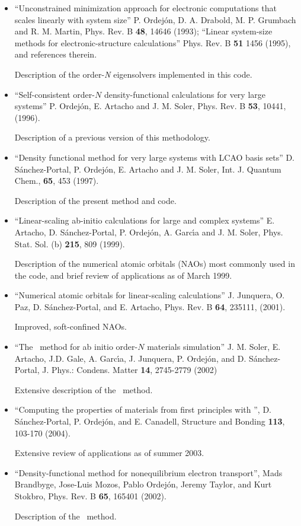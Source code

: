 \begin{itemize}

\item
``Unconstrained minimization approach for electronic computations
that scales linearly with system size''
P. Ordej\'on, D. A. Drabold, M. P. Grumbach and R. M. Martin,
Phys. Rev. B \textbf{48}, 14646 (1993);
``Linear system-size methods for electronic-structure calculations''
Phys. Rev. B \textbf{51} 1456 (1995), and references therein.

Description of the order-\textit{N} eigensolvers
implemented in this code.

\item
``Self-consistent order-$N$ density-functional
calculations for very large systems''
P. Ordej\'on, E. Artacho and J. M. Soler,
Phys. Rev. B \textbf{53}, 10441, (1996).

Description of a previous version of this methodology.

\item
``Density functional method for very large systems with LCAO basis sets''
D. S\'anchez-Portal, P. Ordej\'on, E. Artacho and J. M. Soler,
Int. J. Quantum Chem., \textbf{65}, 453 (1997).

Description of the present method and code.

\item
``Linear-scaling ab-initio calculations for large and complex systems''
E. Artacho, D. S\'anchez-Portal, P. Ordej\'on, A. Garc\'{\i}a and
J. M. Soler, Phys. Stat. Sol. (b) \textbf{215}, 809 (1999).

Description of the numerical atomic orbitals (NAOs) most commonly
used in the code, and brief review of applications as of March 1999.

\item
``Numerical atomic orbitals for linear-scaling calculations''
J. Junquera, O. Paz, D. S\'anchez-Portal, and E. Artacho, Phys. Rev. B
 \textbf{64}, 235111, (2001).

Improved, soft-confined NAOs.

\item
``The \siesta\ method for ab initio order-$N$ materials simulation''
J. M. Soler, E. Artacho, J.D. Gale, A. Garc\'{\i}a, J. Junquera, P. Ordej\'on,
and D. S\'anchez-Portal, J. Phys.: Condens. Matter \textbf{14}, 2745-2779 (2002)

Extensive description of the \siesta\ method.

\item
``Computing the properties of materials from first principles
with  \siesta'', D. S\'anchez-Portal, P. Ordej\'on,
and E. Canadell, Structure and Bonding \textbf{113},
103-170 (2004).

Extensive review of applications as of summer 2003.

\item
 ``Density-functional method for nonequilibrium electron transport'',
 Mads Brandbyge, Jose-Luis Mozos, Pablo Ordej\'on, Jeremy Taylor,
 and Kurt Stokbro, Phys. Rev. B \textbf{65}, 165401 (2002).

 Description of the \tsiesta\ method.

\end{itemize}

